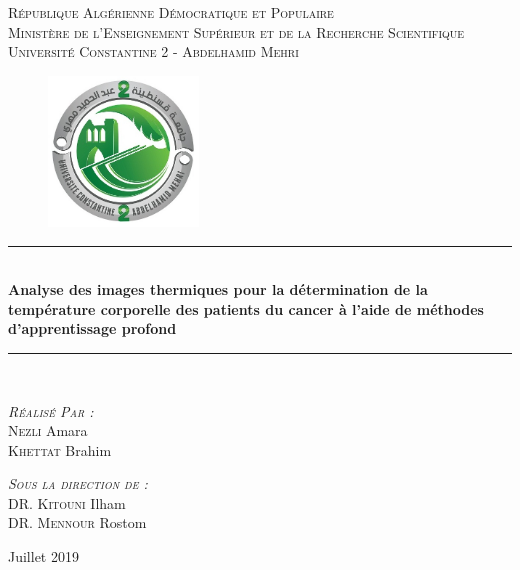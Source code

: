 \documentclass[12pt]{article}
\newcommand{\HRule}{\rule{\linewidth}{0.5mm}}
\begin{document}
\begin{titlepage}
	\begin{sffamily}
		\begin{center}
		\textsc{République Algérienne Démocratique et Populaire\\Ministère de l'Enseignement Supérieur et de la Recherche Scientifique\\Université Constantine 2 - Abdelhamid Mehri}\\[0.5 cm]			\begin{figure}[h]
			\centering
			\includegraphics[height=4cm,width=4cm]{Logo/logo.jpg}
		\end{figure}
		
		 \HRule \\[0.2cm]
    { \huge \bfseries Analyse des images thermiques pour la détermination de la température corporelle des patients du cancer à l'aide de méthodes d'apprentissage profond\\[0.2cm] }
    \HRule \\[4cm]
    
    
        \begin{minipage}{0.4\textwidth}
      \begin{flushleft} \large
      	\emph{\textsc{Réalisé Par :}}\\
		\textsc{Nezli} Amara\\
        \textsc{Khettat} Brahim\\
      \end{flushleft}
    \end{minipage}
    \begin{minipage}{0.4\textwidth}
      \begin{flushright} \large
        \emph{\textsc{Sous la direction de :}}\\ \textsc{DR}. \textsc{Kitouni} Ilham\\
        												\textsc{DR}. \textsc{Mennour} Rostom
      \end{flushright}
    \end{minipage}

    \vfill

    {\large Juillet 2019}
		\end{center}
	\end{sffamily}
\end{titlepage}
\end{document}
